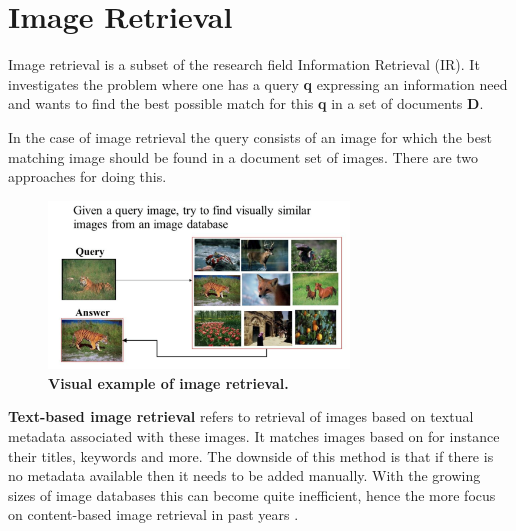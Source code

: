 \documentclass{article}
\begin{document}
\cite{gauch2006finding} %
\cite{wang2008multimodal} %

\cite{herley2006argos} %
\cite{berrani2008non} %

\cite{benezeth2010unsupervised} %
\cite{ibrahim2011tv} %
\cite{abduraman2011unsupervised} %
\fi


\section{Image Retrieval} \label{section:imageretrieval}
Image retrieval is a subset of the research field Information Retrieval (IR). It investigates the problem where one has a query \textbf{q} expressing an information need and wants to find the best possible match for this \textbf{q} in a set of documents \textbf{D}.

In the case of image retrieval the query consists of an image for which the best matching image should be found in a document set of images. There are two approaches for doing this.

\begin{figure}[H]
	\includegraphics[width=8cm]{images/imageretrieval.png}
	\centering
	\caption{\textbf{Visual example of image retrieval.}}
	\label{fig:imageretrieval}
\end{figure}

\textbf{Text-based image retrieval} refers to retrieval of images based on textual metadata associated with these images. It matches images based on for instance their titles, keywords and more. The downside of this method is that if there is no metadata available then it needs to be added manually. With the growing sizes of image databases this can become quite inefficient, hence the more focus on content-based image retrieval in past years \cite{rajam2013survey}.
\end{document}
